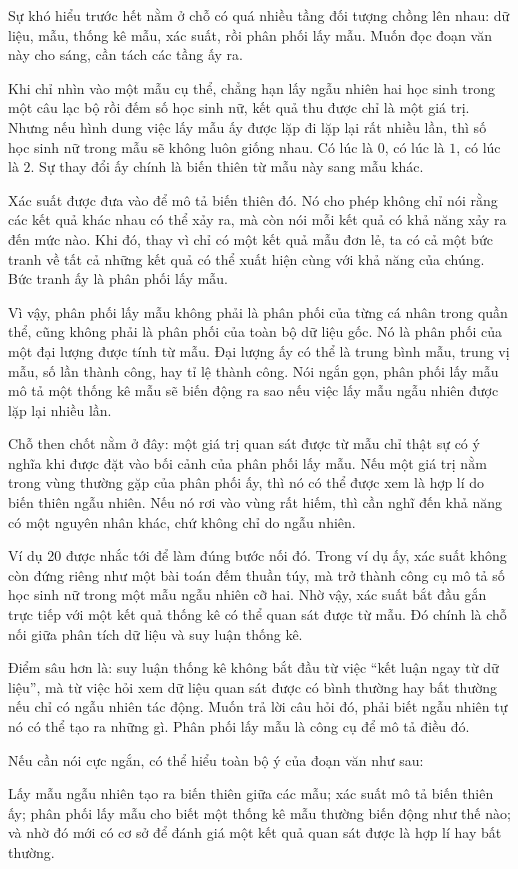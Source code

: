 \documentclass[
  10pt,
  a4paper,
  landscape,
  twoside,
  openany
]{scrbook}
\newcommand{\NOTE}[1]{#1}
\begin{document}
{
\NOTE{Sự khó hiểu trước hết nằm ở chỗ có quá nhiều tầng đối tượng chồng lên nhau: dữ liệu, mẫu, thống kê mẫu, xác suất, rồi phân phối lấy mẫu. Muốn đọc đoạn văn này cho sáng, cần tách các tầng ấy ra.

Khi chỉ nhìn vào một mẫu cụ thể, chẳng hạn lấy ngẫu nhiên hai học sinh trong một câu lạc bộ rồi đếm số học sinh nữ, kết quả thu được chỉ là một giá trị. Nhưng nếu hình dung việc lấy mẫu ấy được lặp đi lặp lại rất nhiều lần, thì số học sinh nữ trong mẫu sẽ không luôn giống nhau. Có lúc là $0$, có lúc là $1$, có lúc là $2$. Sự thay đổi ấy chính là biến thiên từ mẫu này sang mẫu khác.

Xác suất được đưa vào để mô tả biến thiên đó. Nó cho phép không chỉ nói rằng các kết quả khác nhau có thể xảy ra, mà còn nói mỗi kết quả có khả năng xảy ra đến mức nào. Khi đó, thay vì chỉ có một kết quả mẫu đơn lẻ, ta có cả một bức tranh về tất cả những kết quả có thể xuất hiện cùng với khả năng của chúng. Bức tranh ấy là phân phối lấy mẫu.

Vì vậy, phân phối lấy mẫu không phải là phân phối của từng cá nhân trong quần thể, cũng không phải là phân phối của toàn bộ dữ liệu gốc. Nó là phân phối của một đại lượng được tính từ mẫu. Đại lượng ấy có thể là trung bình mẫu, trung vị mẫu, số lần thành công, hay tỉ lệ thành công. Nói ngắn gọn, phân phối lấy mẫu mô tả một thống kê mẫu sẽ biến động ra sao nếu việc lấy mẫu ngẫu nhiên được lặp lại nhiều lần.

Chỗ then chốt nằm ở đây: một giá trị quan sát được từ mẫu chỉ thật sự có ý nghĩa khi được đặt vào bối cảnh của phân phối lấy mẫu. Nếu một giá trị nằm trong vùng thường gặp của phân phối ấy, thì nó có thể được xem là hợp lí do biến thiên ngẫu nhiên. Nếu nó rơi vào vùng rất hiếm, thì cần nghĩ đến khả năng có một nguyên nhân khác, chứ không chỉ do ngẫu nhiên.

Ví dụ 20 được nhắc tới để làm đúng bước nối đó. Trong ví dụ ấy, xác suất không còn đứng riêng như một bài toán đếm thuần túy, mà trở thành công cụ mô tả số học sinh nữ trong một mẫu ngẫu nhiên cỡ hai. Nhờ vậy, xác suất bắt đầu gắn trực tiếp với một kết quả thống kê có thể quan sát được từ mẫu. Đó chính là chỗ nối giữa phân tích dữ liệu và suy luận thống kê.

Điểm sâu hơn là: suy luận thống kê không bắt đầu từ việc “kết luận ngay từ dữ liệu”, mà từ việc hỏi xem dữ liệu quan sát được có bình thường hay bất thường nếu chỉ có ngẫu nhiên tác động. Muốn trả lời câu hỏi đó, phải biết ngẫu nhiên tự nó có thể tạo ra những gì. Phân phối lấy mẫu là công cụ để mô tả điều đó.

Nếu cần nói cực ngắn, có thể hiểu toàn bộ ý của đoạn văn như sau:

Lấy mẫu ngẫu nhiên tạo ra biến thiên giữa các mẫu; xác suất mô tả biến thiên ấy; phân phối lấy mẫu cho biết một thống kê mẫu thường biến động như thế nào; và nhờ đó mới có cơ sở để đánh giá một kết quả quan sát được là hợp lí hay bất thường.}
}
\end{document}

